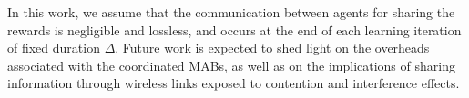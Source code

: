 In this work, we assume that the communication between agents for sharing the rewards is negligible and lossless, and occurs at the end of each learning iteration of fixed duration $\Delta$. Future work is expected to shed light on the overheads associated with the coordinated MABs, as well as on the implications of sharing information through wireless links exposed to contention and interference effects.
